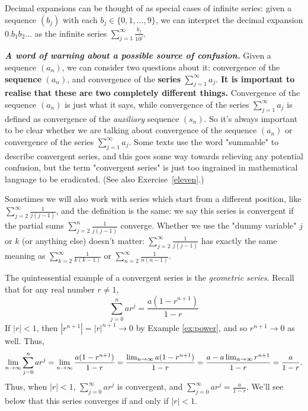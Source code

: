 \documentclass[11pt,dvipsnames]{book}
\numberwithin{equation}{section} %
\numberwithin{figure}{section} %
\numberwithin{table}{section} %
\begin{document}
\medskip
Decimal expansions can be thought of as special cases of infinite series: given a sequence $(b_j)$ with each $b_j \in \{0, 1, \dots , 9\}$, we can interpret the decimal expansion $0.b_1b_2 \dots$ as the infinite series $\sum_{j=1}^\infty \frac{b_j}{10^j}$.

\medskip
\noindent
{\em \bf \em A word of warning about a possible source of confusion.} Given a sequence $(a_n)$, we can consider two questions about it: convergence of the {\bf sequence} $(a_n)$, and convergence of the {\bf series} $\sum_{j=1}^\infty a_j$. {\bf It is important to realise that these are two completely different things.} Convergence of the sequence $(a_n)$ is just what it says, while convergence of the series $\sum_{j=1}^\infty a_j$
is defined as convergence of the {\em auxiliary} sequence $(s_n)$. So it's always important to be clear whether we are talking about convergence of the sequence $(a_n)$ or convergence of the series $\sum_{j=1}^\infty a_j$. Some texts use the word "summable" to describe convergent series, and this goes some way towards relieving any potential confusion, but the term "convergent series" is just too ingrained in mathematical language to be eradicated. (See also Exercise~\ref{eleven}.)

\medskip
Sometimes we will also work with series which start from a different position, like $\sum_{j=2}^{\infty} \frac{1}{j(j-1)}$, and the definition is the same: we say this series is convergent if the partial sums $\sum_{j=2}^{n} \frac{1}{j(j-1)}$ converge. Whether we use the "dummy variable"
$j$ or $k$ (or anything else) doesn't matter: $\sum_{j=2}^{\infty} \frac{1}{j(j-1)}$ has exactly the same meaning as $\sum_{k=2}^{\infty} \frac{1}{k(k-1)}$ or $\sum_{n=2}^{\infty} \frac{1}{n(n-1)}$.

\begin{example}
\label{ex:geometric-series}
The quintessential example of a convergent series is the {\it geometric series}. Recall that for any real number $r \neq 1$, 
\begin{equation}
\label{e:gs}
\sum_{j=0}^{n} ar ^{j}=\frac{a(1-r^{n+1})}{1-r}
\end{equation}
If $|r|<1$, then $|r^{n+1}|=|r|^{n+1}\rightarrow 0$ by Example \ref{ex:power}, and so $r^{n+1}\rightarrow 0$ as well. Thus,
\[
\lim_{n\rightarrow\infty} \sum_{j=0}^{n}ar^{j} = \lim_{n\rightarrow\infty} \frac{a(1-r^{n+1})}{1-r} = \frac{\lim_{n\rightarrow\infty} a(1-r^{n+1})}{1-r}=\frac{a- a\lim_{n\rightarrow\infty} r^{n+1}}{1-r}=\frac{a}{1-r}.\]
Thus, when $|r|<1$, $\sum_{j=0}^\infty a r^{j}$ is convergent, and $\sum_{j=0}^{\infty} a r^{j}=\frac{a}{1-r}$. We'll see below that this series converges if and only if $|r|<1$.\\
%
\end{example}
\end{document}
